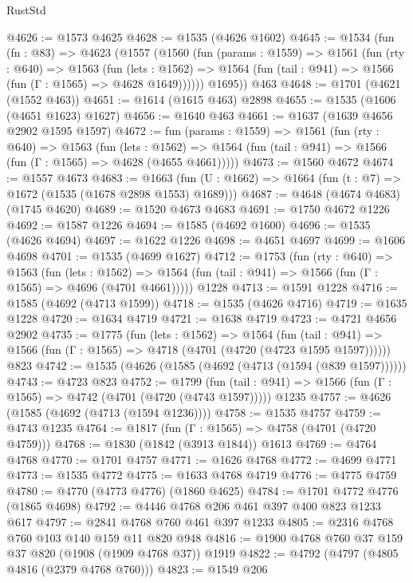 \begin{lexlean}{RustStd}
\begin{coremodule}
@4626 := @1573 @4625
@4628 := @1535 (@4626 @1602)
@4645 := @1534
    (fun (fn : @83) =>
    @4623
      (@1557
        (@1560
          (fun (params : @1559) =>
          @1561
            (fun (rty : @640) =>
            @1563
              (fun (lets : @1562) =>
              @1564 (fun (tail : @941) => @1566 (fun (Γ : @1565) => @4628 @1649))))))
        @1695))
    @463
@4648 := @1701 (@4621 (@1552 @463))
@4651 := @1614 (@1615 @463) @2898
@4655 := @1535 (@1606 (@4651 @1623) @1627)
@4656 := @1640 @463
@4661 := @1637 (@1639 @4656 @2902 @1595 @1597)
@4672 := fun (params : @1559) =>
  @1561
    (fun (rty : @640) =>
    @1563
      (fun (lets : @1562) =>
      @1564 (fun (tail : @941) => @1566 (fun (Γ : @1565) => @4628 (@4655 @4661)))))
@4673 := @1560 @4672
@4674 := @1557 @4673
@4683 := @1663 (fun (U : @1662) => @1664 (fun (t : @7) => @1672 (@1535 (@1678 @2898 @1553) @1689)))
@4687 := @4648 (@4674 @4683) (@1745 @4620)
@4689 := @1520 @4673 @4683
@4691 := @1750 @4672 @1226
@4692 := @1587 @1226
@4694 := @1585 (@4692 @1600)
@4696 := @1535 (@4626 @4694)
@4697 := @1622 @1226
@4698 := @4651 @4697
@4699 := @1606 @4698
@4701 := @1535 (@4699 @1627)
@4712 := @1753
    (fun (rty : @640) =>
    @1563
      (fun (lets : @1562) =>
      @1564 (fun (tail : @941) => @1566 (fun (Γ : @1565) => @4696 (@4701 @4661)))))
    @1228
@4713 := @1591 @1228
@4716 := @1585 (@4692 (@4713 @1599))
@4718 := @1535 (@4626 @4716)
@4719 := @1635 @1228
@4720 := @1634 @4719
@4721 := @1638 @4719
@4723 := @4721 @4656 @2902
@4735 := @1775
    (fun (lets : @1562) =>
    @1564
      (fun (tail : @941) => @1566 (fun (Γ : @1565) => @4718 (@4701 (@4720 (@4723 @1595 @1597))))))
    @823
@4742 := @1535 (@4626 (@1585 (@4692 (@4713 (@1594 (@839 @1597))))))
@4743 := @4723 @823
@4752 := @1799
    (fun (tail : @941) => @1566 (fun (Γ : @1565) => @4742 (@4701 (@4720 (@4743 @1597)))))
    @1235
@4757 := @4626 (@1585 (@4692 (@4713 (@1594 @1236))))
@4758 := @1535 @4757
@4759 := @4743 @1235
@4764 := @1817 (fun (Γ : @1565) => @4758 (@4701 (@4720 @4759)))
@4768 := @1830 (@1842 (@3913 @1844)) @1613
@4769 := @4764 @4768
@4770 := @1701 @4757
@4771 := @1626 @4768
@4772 := @4699 @4771
@4773 := @1535 @4772
@4775 := @1633 @4768 @4719
@4776 := @4775 @4759
@4780 := @4770 (@4773 @4776) (@1860 @4625)
@4784 := @1701 @4772 @4776 (@1865 @4698)
@4792 := @4446 @4768 @206 @461 @397 @400 @823 @1233 @617
@4797 := @2841 @4768 @760 @461 @397 @1233
@4805 := @2316 @4768 @760 @103 @140 @159 @11 @820 @948
@4816 := @1900 @4768 @760 @37 @159 @37 @820 (@1908 (@1909 @4768 @37)) @1919
@4822 := @4792 (@4797 (@4805 @4816 (@2379 @4768 @760)))
@4823 := @1549 @206

\end{coremodule}
\end{lexlean}
